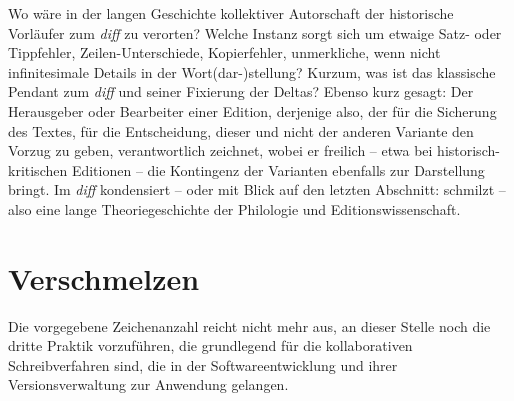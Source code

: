 \documentclass[a4paper,12pt]{article}
\begin{document}
Wo wäre in der langen Geschichte kollektiver Autorschaft der historische Vorläufer zum \emph{diff} zu verorten? Welche Instanz sorgt sich um etwaige Satz- oder Tippfehler, Zeilen-Unterschiede, Kopierfehler, unmerkliche, wenn nicht infinitesimale Details in der Wort(dar-)stellung? Kurzum, was ist das klassische Pendant zum \emph{diff} und seiner Fixierung der Deltas? Ebenso kurz gesagt: Der Herausgeber oder Bearbeiter einer Edition, derjenige also, der für die Sicherung des Textes, für die Entscheidung, dieser und nicht der anderen Variante den Vorzug zu geben, verantwortlich zeichnet, wobei er freilich – etwa bei historisch-kritischen Editionen – die Kontingenz der Varianten ebenfalls zur Darstellung bringt. Im \emph{diff} kondensiert – oder mit Blick auf den letzten Abschnitt: schmilzt – also eine lange Theoriegeschichte der Philologie und Editionswissenschaft.  

\begin{comment}

Man könnte einen Text, der in Ko-Autorschaft entsteht, natürlich auch in seinen Varianten drucken: 

Bewusste Abweichungen inhaltlicher Art vs. Fehlern: diff findet beides. 
Varianten ausstellen.

Oder einfach nur die Abweichung von der Deckungsgleichheit. Beim Übereinanderlegen oder zeichenweisen Vergleich der Inhalte werden die Unterschiede markiert. 


Die Eingabe von Texten im Redundanz-Modus.

Einsatz mit Skriptorien...

Versionieren, mit Indizes versehen.

Mimetisches:
Wenn einer Als-Ob Auftritt, dann werden vor allem die Differenzen beobachtet...

Scriptorium, Bouvard \& Pecuchet (am Ende)
Name der Rose

\end{comment}



\section{Verschmelzen}

Die vorgegebene Zeichenanzahl reicht nicht mehr aus, an dieser Stelle noch die dritte Praktik vorzuführen, die grundlegend für die kollaborativen Schreibverfahren sind, die in der Softwareentwicklung und ihrer Versionsverwaltung zur Anwendung gelangen. 
\end{document}

